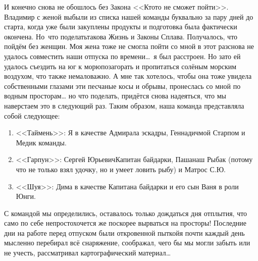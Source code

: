 И конечно снова не обошлось без Закона <<Кто\sdash то не сможет пойти>>. Владимир с женой выбыли из списка нашей команды буквально за пару дней до старта, когда уже были закуплены продукты и подготовка была фактически окончена. Но~что поделать\mdash такова Жизнь и Законы Сплава. Получалось, что пойдём без женщин. Моя жена тоже не смогла пойти со мной в этот раз\mdash снова не удалось совместить наши отпуска по времени\ldots~я был расстроен. Но зато ей удалось съездить на юг к морю\mdash позагорать и пропитаться солёным морским воздухом, что также немаловажно. А мне так хотелось, чтобы она тоже увидела собственными глазами эти песчаные косы и обрывы, пронеслась со мной по водным просторам… но что поделать, придётся снова надеяться, что мы наверстаем это в следующий раз. 
Таким образом, наша команда представляла собой следующее:
\begin{enumerate}
	\item <<Таймень>>: Я в качестве Адмирала эскадры, Геннадич\mdash мой Старпом и Медик команды.
	\item <<Гарпун>>: Сергей Юрьевич\mdash  Капитан байдарки, Паша\mdash наш Рыбак (потому что не только взял удочку, но и умеет ловить рыбу) и Матрос С.Ю.
	\item <<Шуя>>: Дима в качестве Капитана байдарки и его сын Ваня в роли Юнги.
\end{enumerate}

С командой мы определились, оставалось только дождаться дня отплытия, что само по себе непросто\mdash хочется же поскорее вырваться на просторы! Последние дни на работе перед отпуском были откровенной пыткой\mdash я почти каждый день мысленно перебирал всё снаряжение, соображал, чего бы мы могли забыть или не учесть, рассматривал картографический материал\ldots

\begin{center}
\end{center}
